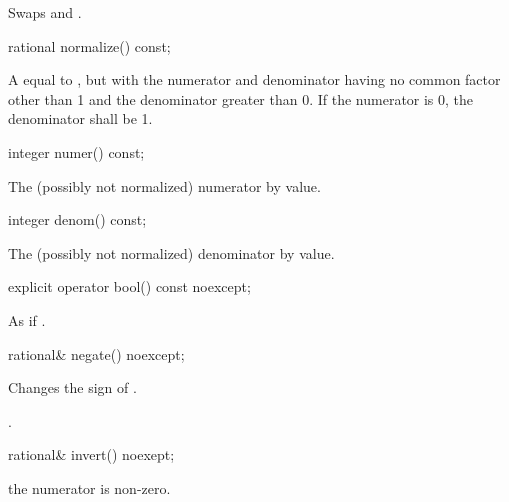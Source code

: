 \begin{addedblock}
\begin{itemdescr}
\effects Swaps  and .
\end{itemdescr}

\begin{itemdecl}
rational normalize() const;
\end{itemdecl}

\begin{itemdescr}
\returns A  equal to , but with the numerator and denominator having no common factor other than 1 and the denominator greater than 0. If the numerator is 0, the denominator shall be 1.
\end{itemdescr}

\begin{itemdecl}
integer numer() const;
\end{itemdecl}

\begin{itemdescr}
\returns The (possibly not normalized) numerator by value.
\end{itemdescr}

\begin{itemdecl}
integer denom() const;
\end{itemdecl}

\begin{itemdescr}
\returns The (possibly not normalized) denominator by value.
\end{itemdescr}

\begin{itemdecl}
explicit operator bool() const noexcept;
\end{itemdecl}

\begin{itemdescr}
\returns As if .
\end{itemdescr}

\begin{itemdecl}
rational& negate() noexcept;
\end{itemdecl}

\begin{itemdescr}
\effects Changes the sign of .

\returns {}.
\end{itemdescr}

\begin{itemdecl}
rational& invert() noexept;
\end{itemdecl}

\begin{itemdescr}
\requires the numerator is non-zero.
    

\end{itemdescr}
\end{addedblock}
